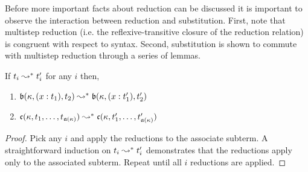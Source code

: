 Before more important facts about reduction can be discussed it is important to observe the interaction between reduction and substitution.
First, note that multistep reduction (i.e. the reflexive-transitive closure of the reduction relation) is congruent with respect to syntax.
Second, substitution is shown to commute with multistep reduction through a series of lemmas.

\begin{lemma}
    If $t_i \leadsto^* t_i^\prime$ for any $i$ then,
    \begin{enumerate}
        \item $\mathfrak{b}(\kappa, (x : t_1), t_2) \leadsto^* \mathfrak{b}(\kappa, (x : t_1^\prime), t_2^\prime)$
        \item $\mathfrak{c}(\kappa, t_1,\ldots,t_{\mathfrak{a}(\kappa)}) \leadsto^* \mathfrak{c}(\kappa, t_1^\prime,\ldots,t_{\mathfrak{a}(\kappa)}^\prime)$
    \end{enumerate}
    \label{lem:2:beta_par}
\end{lemma}
\begin{proof}
    Pick any $i$ and apply the reductions to the associate subterm.
    A straightforward induction on $t_i \leadsto^* t_i^\prime$ demonstrates that the reductions apply only to the associated subterm.
    Repeat until all $i$ reductions are applied.
\end{proof}

